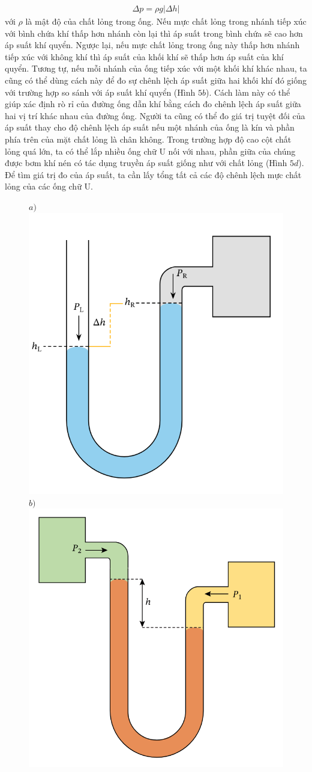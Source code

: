\begin{multicols}{2}
	\begin{align*}
		\Delta p = \rho g |\Delta h|
	\end{align*}
	với $\rho$ là mật độ của chất lỏng trong ống. 
	\vskip 0.1cm
	Nếu mực chất lỏng trong nhánh tiếp xúc với bình chứa khí thấp hơn nhánh còn lại thì áp suất trong bình chứa sẽ cao hơn áp suất khí quyển. Ngược lại, nếu mực chất lỏng trong ống này thấp hơn nhánh tiếp xúc với không khí thì áp suất của khối khí sẽ thấp hơn áp suất của khí quyển.
	\vskip 0.1cm
	Tương tự, nếu mỗi nhánh của ống tiếp xúc với một khối khí khác nhau, ta cũng có thể dùng cách này để đo sự chênh lệch áp suất giữa hai khối khí đó giống với trường hợp so sánh với áp suất khí quyển (Hình $5b$). Cách làm này có thể giúp xác định rò rỉ của đường ống dẫn khí bằng cách đo chênh lệch áp suất giữa hai vị trí khác nhau của đường ống.
	\vskip 0.1cm
	Người ta cũng có thể đo giá trị tuyệt đối của áp suất thay cho độ chênh lệch áp suất nếu một nhánh của ống là kín và phần phía trên của mặt chất lỏng là chân không. Trong trường hợp độ cao cột chất lỏng quá lớn, ta có thể lắp nhiều ống chữ U nối với nhau, phần giữa của chúng được bơm khí nén có tác dụng truyền áp suất giống như với chất lỏng (Hình $5d$). Để tìm giá trị đo của áp suất, ta cần lấy tổng tất cả các độ chênh lệch mực chất lỏng của các ống chữ U.
	\begin{figure}[H]
		\vspace*{5pt}
		\centering
		\captionsetup{labelformat= empty, justification=centering}
		$a)$\includegraphics[height = 0.4\linewidth]{6}
		$b)$\includegraphics[height = 0.4\linewidth]{7}
		

\end{figure}
\end{multicols}
